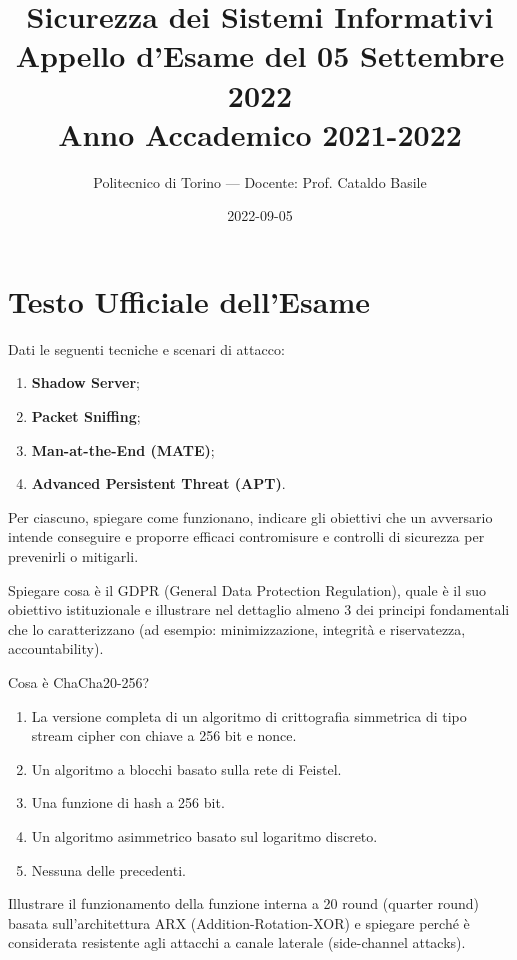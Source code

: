 \documentclass[11pt,a4paper]{article}
\begin{document}
\title{\textbf{Sicurezza dei Sistemi Informativi} \\ \large Appello d'Esame del 05 Settembre 2022 \\ \small Anno Accademico 2021-2022}
\author{Politecnico di Torino --- Docente: Prof. Cataldo Basile}
\date{2022-09-05}
\maketitle


\section{Testo Ufficiale dell'Esame}

\begin{questionbox}
Dati le seguenti tecniche e scenari di attacco:
\begin{enumerate}[label=\alph*.]
    \item \textbf{Shadow Server};
    \item \textbf{Packet Sniffing};
    \item \textbf{Man-at-the-End (MATE)};
    \item \textbf{Advanced Persistent Threat (APT)}.
\end{enumerate}
Per ciascuno, spiegare come funzionano, indicare gli obiettivi che un avversario intende conseguire e proporre efficaci contromisure e controlli di sicurezza per prevenirli o mitigarli.
\end{questionbox}

\begin{questionbox}
Spiegare cosa \`e il GDPR (General Data Protection Regulation), quale \`e il suo obiettivo istituzionale e illustrare nel dettaglio almeno 3 dei principi fondamentali che lo caratterizzano (ad esempio: minimizzazione, integrit\`a e riservatezza, accountability).
\end{questionbox}

\begin{questionbox}
Cosa \`e ChaCha20-256?
\begin{enumerate}[label=\alph*.]
    \item La versione completa di un algoritmo di crittografia simmetrica di tipo stream cipher con chiave a 256 bit e nonce.
    \item Un algoritmo a blocchi basato sulla rete di Feistel.
    \item Una funzione di hash a 256 bit.
    \item Un algoritmo asimmetrico basato sul logaritmo discreto.
    \item Nessuna delle precedenti.
\end{enumerate}
Illustrare il funzionamento della funzione interna a 20 round (quarter round) basata sull'architettura ARX (Addition-Rotation-XOR) e spiegare perch\'e \`e considerata resistente agli attacchi a canale laterale (side-channel attacks).
\end{questionbox}
\end{document}
